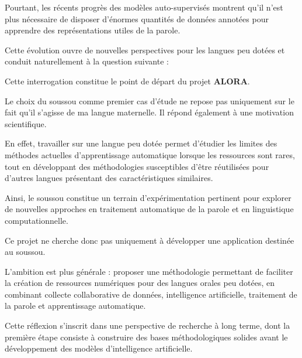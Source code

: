 Pourtant, les récents progrès des modèles auto-supervisés montrent qu'il
n'est plus nécessaire de disposer d'énormes quantités de données annotées
pour apprendre des représentations utiles de la parole.

Cette évolution ouvre de nouvelles perspectives pour les langues peu
dotées et conduit naturellement à la question suivante :

\begin{center}
\end{center}

Cette interrogation constitue le point de départ du projet
\textbf{ALORA}.

\vspace{0.5cm}

Le choix du soussou comme premier cas d'étude ne repose pas uniquement sur
le fait qu'il s'agisse de ma langue maternelle. Il répond également à une
motivation scientifique.

En effet, travailler sur une langue peu dotée permet d'étudier les limites
des méthodes actuelles d'apprentissage automatique lorsque les ressources
sont rares, tout en développant des méthodologies susceptibles d'être
réutilisées pour d'autres langues présentant des caractéristiques
similaires.

Ainsi, le soussou constitue un terrain d'expérimentation pertinent pour
explorer de nouvelles approches en traitement automatique de la parole et
en linguistique computationnelle.

\vspace{0.5cm}

Ce projet ne cherche donc pas uniquement à développer une application
destinée au soussou.

L'ambition est plus générale : proposer une méthodologie permettant de
faciliter la création de ressources numériques pour des langues orales peu
dotées, en combinant collecte collaborative de données, intelligence
artificielle, traitement de la parole et apprentissage automatique.

Cette réflexion s'inscrit dans une perspective de recherche à long terme,
dont la première étape consiste à construire des bases méthodologiques
solides avant le développement des modèles d'intelligence artificielle.